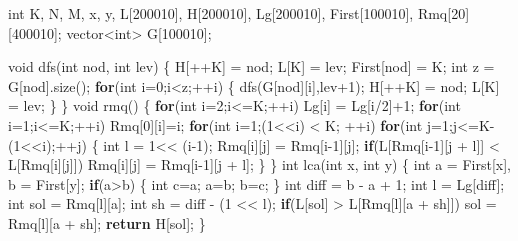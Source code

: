 \documentclass[10pt,]{article}
\newenvironment{Shaded}{}{}
\newcommand{\KeywordTok}[1]{\textcolor[rgb]{0.00,0.44,0.13}{\textbf{{#1}}}}
\newcommand{\DataTypeTok}[1]{\textcolor[rgb]{0.56,0.13,0.00}{{#1}}}
\newcommand{\DecValTok}[1]{\textcolor[rgb]{0.25,0.63,0.44}{{#1}}}
\newcommand{\NormalTok}[1]{{#1}}
\begin{document}
\begin{Shaded}
\begin{Highlighting}[]
\DataTypeTok{int} \NormalTok{K, N, M, x, y, L[}\DecValTok{200010}\NormalTok{], H[}\DecValTok{200010}\NormalTok{], Lg[}\DecValTok{200010}\NormalTok{], First[}\DecValTok{100010}\NormalTok{], Rmq[}\DecValTok{20}\NormalTok{][}\DecValTok{400010}\NormalTok{];}
\NormalTok{vector<}\DataTypeTok{int}\NormalTok{> G[}\DecValTok{100010}\NormalTok{];}

\DataTypeTok{void} \NormalTok{dfs(}\DataTypeTok{int} \NormalTok{nod, }\DataTypeTok{int} \NormalTok{lev) \{}
  \NormalTok{H[++K] = nod;}
  \NormalTok{L[K] = lev;}
  \NormalTok{First[nod] = K;}
  \DataTypeTok{int} \NormalTok{z = G[nod].size();}
  \KeywordTok{for}\NormalTok{(}\DataTypeTok{int} \NormalTok{i=}\DecValTok{0}\NormalTok{;i<z;++i) \{}
    \NormalTok{dfs(G[nod][i],lev}\DecValTok{+1}\NormalTok{);}
    \NormalTok{H[++K] = nod;}
    \NormalTok{L[K] = lev;}
  \NormalTok{\}}
\NormalTok{\}}
\DataTypeTok{void} \NormalTok{rmq() \{}
  \KeywordTok{for}\NormalTok{(}\DataTypeTok{int} \NormalTok{i=}\DecValTok{2}\NormalTok{;i<=K;++i)}
    \NormalTok{Lg[i] = Lg[i/}\DecValTok{2}\NormalTok{]+}\DecValTok{1}\NormalTok{;}
  \KeywordTok{for}\NormalTok{(}\DataTypeTok{int} \NormalTok{i=}\DecValTok{1}\NormalTok{;i<=K;++i)}
    \NormalTok{Rmq[}\DecValTok{0}\NormalTok{][i]=i;}
  \KeywordTok{for}\NormalTok{(}\DataTypeTok{int} \NormalTok{i=}\DecValTok{1}\NormalTok{;(}\DecValTok{1}\NormalTok{<<i) < K; ++i)}
    \KeywordTok{for}\NormalTok{(}\DataTypeTok{int} \NormalTok{j=}\DecValTok{1}\NormalTok{;j<=K-(}\DecValTok{1}\NormalTok{<<i);++j) \{}
      \DataTypeTok{int} \NormalTok{l = }\DecValTok{1}\NormalTok{<< (i}\DecValTok{-1}\NormalTok{);}
      \NormalTok{Rmq[i][j] = Rmq[i}\DecValTok{-1}\NormalTok{][j];}
      \KeywordTok{if}\NormalTok{(L[Rmq[i}\DecValTok{-1}\NormalTok{][j + l]] < L[Rmq[i][j]])}
        \NormalTok{Rmq[i][j] = Rmq[i}\DecValTok{-1}\NormalTok{][j + l];}
    \NormalTok{\}}
\NormalTok{\}}
\DataTypeTok{int} \NormalTok{lca(}\DataTypeTok{int} \NormalTok{x, }\DataTypeTok{int} \NormalTok{y) \{}
  \DataTypeTok{int} \NormalTok{a = First[x], b = First[y];}
  \KeywordTok{if}\NormalTok{(a>b) \{}
    \DataTypeTok{int} \NormalTok{c=a;}
    \NormalTok{a=b;}
    \NormalTok{b=c;}
  \NormalTok{\}}
  \DataTypeTok{int} \NormalTok{diff = b - a + }\DecValTok{1}\NormalTok{;}
  \DataTypeTok{int} \NormalTok{l = Lg[diff];}
  \DataTypeTok{int} \NormalTok{sol = Rmq[l][a];}
  \DataTypeTok{int} \NormalTok{sh = diff - (}\DecValTok{1} \NormalTok{<< l);}
  \KeywordTok{if}\NormalTok{(L[sol] > L[Rmq[l][a + sh]])}
    \NormalTok{sol = Rmq[l][a + sh];}
  \KeywordTok{return} \NormalTok{H[sol];}
\NormalTok{\}}
\end{Highlighting}
\end{Shaded}
\end{document}

